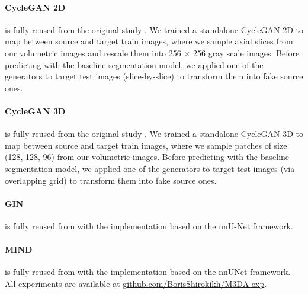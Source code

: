 \paragraph{CycleGAN 2D} is fully reused from the original study \cite{cyclegan}. We trained a standalone CycleGAN 2D to map between source and target train images, where we sample axial slices from our volumetric images and rescale them into 256 $\times$ 256 gray scale images. Before predicting with the baseline segmentation model, we applied one of the generators to target test images (slice-by-slice) to transform them into fake source ones.

\paragraph{CycleGAN 3D} is fully reused from the original study \cite{cyclegan3d}. We trained a standalone CycleGAN 3D to map between source and target train images, where we sample patches of size (128, 128, 96) from our volumetric images. Before predicting with the baseline segmentation model, we applied one of the generators to target test images (via overlapping grid) to transform them into fake source ones.

\paragraph{GIN} is fully reused from \cite{gin} with the implementation based on the nnU-Net framework.

\paragraph{MIND} is fully reused from \cite{dg_tta} with the implementation based on the nnUNet framework.\\


All experiments are available at \href{https://github.com/BorisShirokikh/M3DA-exp}{github.com/BorisShirokikh/M3DA-exp}.

